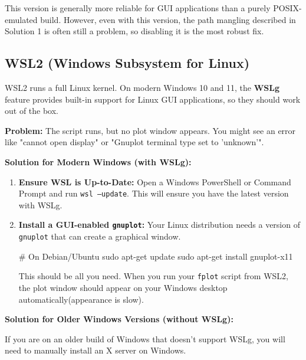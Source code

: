 \documentclass[12pt, letterpaper]{article}
\begin{document}
	This version is generally more reliable for GUI applications than a purely POSIX-emulated build. However, even with this version, the path mangling described in Solution 1 is often still a problem, so disabling it is the most robust fix.
	
	\subsection{WSL2 (Windows Subsystem for Linux)}
	
	WSL2 runs a full Linux kernel. On modern Windows 10 and 11, the \textbf{WSLg} feature provides built-in support for Linux GUI applications, so they should work out of the box.
	
	\textbf{Problem:} The script runs, but no plot window appears. You might see an error like "cannot open display" or "Gnuplot terminal type set to 'unknown'".
	
	\textbf{Solution for Modern Windows (with WSLg):}
	
	\begin{enumerate}
		\item \textbf{Ensure WSL is Up-to-Date:} Open a Windows PowerShell or Command Prompt and run \texttt{wsl --update}. This will ensure you have the latest version with WSLg.
		\item \textbf{Install a GUI-enabled \texttt{gnuplot}:} Your Linux distribution needs a version of \texttt{gnuplot} that can create a graphical window.
		\begin{bashcode}
# On Debian/Ubuntu
sudo apt-get update
sudo apt-get install gnuplot-x11
		\end{bashcode}
		This should be all you need. When you run your \texttt{fplot} script from WSL2, the plot window should appear on your Windows desktop automatically(appearance is slow).
	\end{enumerate}
	
	\textbf{Solution for Older Windows Versions (without WSLg):}
	
	If you are on an older build of Windows that doesn't support WSLg, you will need to manually install an X server on Windows.
	
\end{document}
